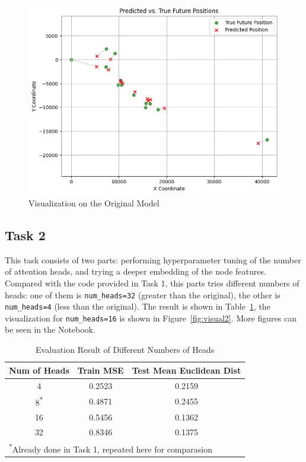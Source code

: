 \documentclass[conference]{IEEEtran}
\begin{document}
\begin{figure}[htbp]
    \centering
    \includegraphics[width=0.8\linewidth]{figvisual1.png}
    \caption{Visualization on the Original Model}
    \label{fig:visual1}
\end{figure}

\subsection*{Task 2}

This task consists of two parts: performing hyperparameter tuning of the number
of attention heads, and trying a deeper embedding of the node features.
Compared with the code provided in Task 1, this parts tries different numbers
of heads: one of them is \texttt{num\_heads=32} (greater than the original), the
other is \texttt{num\_heads=4} (less than the original). The result is shown in
Table~\ref{tab:nh}, the visualization for \texttt{num\_heads=16} is shown in
Figure~\ref{fig:visual2}. More figures can be seen in the Notebook.

\begin{table}[htbp]
    \caption{Evaluation Result of Different Numbers of Heads}
    \begin{center}
    \begin{tabular}{|c|c|c|}
    \hline
    \textbf{Num of Heads} & \textbf{Train MSE} & \textbf{Test Mean Euclidean Dist} \\
    \hline
    4 & 0.2523 & 0.2159 \\
    \hline
    8\textsuperscript{*} & 0.4871 & 0.2455 \\
    \hline
    16 & 0.5456 & 0.1362 \\
    \hline
    32 & 0.8346 & 0.1375 \\
    \hline

    \multicolumn{3}{l}{\textsuperscript{*}Already done in Task 1, repeated here
        for comparasion}
    \end{tabular}
    \label{tab:nh}
    \end{center}
\end{table}
\end{document}
